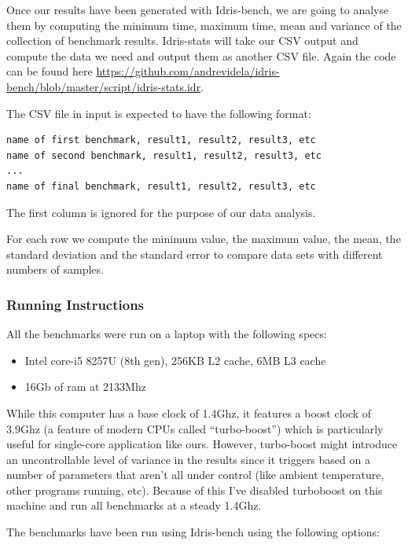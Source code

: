 \documentclass[
]{article}
\providecommand{\tightlist}{%
  \setlength{\itemsep}{0pt}\setlength{\parskip}{0pt}}
\begin{document}
Once our results have been generated with Idris-bench, we are going to
analyse them by computing the minimum time, maximum time, mean and
variance of the collection of benchmark results. Idris-stats will take
our CSV output and compute the data we need and output them as another
CSV file. Again the code can be found here
\url{https://github.com/andrevidela/idris-bench/blob/master/script/idris-stats.idr}.

The CSV file in input is expected to have the following format:

\begin{verbatim}
name of first benchmark, result1, result2, result3, etc
name of second benchmark, result1, result2, result3, etc
...
name of final benchmark, result1, result2, result3, etc
\end{verbatim}

The first column is ignored for the purpose of our data analysis.

For each row we compute the minimum value, the maximum value, the mean,
the standard deviation and the standard error to compare data sets with
different numbers of samples.

\hypertarget{running-instructions}{%
\subsubsection{Running Instructions}\label{running-instructions}}

All the benchmarks were run on a laptop with the following specs:

\begin{itemize}
\tightlist
\item
  Intel core-i5 8257U (8th gen), 256KB L2 cache, 6MB L3 cache
\item
  16Gb of ram at 2133Mhz
\end{itemize}

While this computer has a base clock of 1.4Ghz, it features a boost
clock of 3.9Ghz (a feature of modern CPUs called ``turbo-boost'') which
is particularly useful for single-core application like ours. However,
turbo-boost might introduce an uncontrollable level of variance in the
results since it triggers based on a number of parameters that aren't
all under control (like ambient temperature, other programs running,
etc). Because of this I've disabled turboboost on this machine and run
all benchmarks at a steady 1.4Ghz.

The benchmarks have been run using Idris-bench using the following
options:
\end{document}
